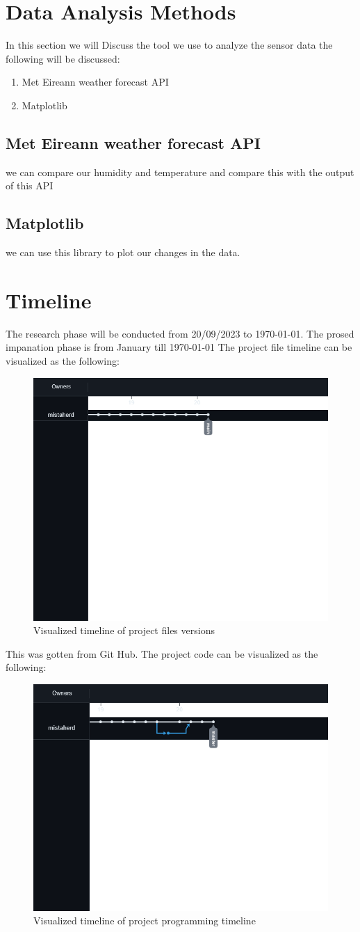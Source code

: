 \section{Data Analysis Methods}
In this section we will Discuss the tool we use to analyze the sensor data the following will be discussed:
\begin{enumerate}
    \item Met Eireann weather forecast API
    \item Matplotlib
\end{enumerate}
\subsection{Met Eireann weather forecast API}
we can compare our humidity and temperature and compare this with the output of this  API
\subsection{Matplotlib}
we can use this library to plot our changes in the data.


\section{Timeline}
The research phase will be conducted from 20/09/2023 to \today. The prosed impanation phase is from January till \today
The project file timeline can be visualized as  the following:
\begin{figure}[h!]
    \centering
    \includegraphics[width=0.5\linewidth]{Images/timeline_of_file.png}
    \caption{Visualized timeline of project files versions}
    \label{Visualized timeline of project files versions}
\end{figure}
This was gotten from Git Hub.
The  project code can be visualized as the following:
\begin{figure}[h!]
    \centering
    \includegraphics[width=0.5\linewidth]{Images/timeline_of_code.png}
    \caption{Visualized timeline of project programming timeline}
    \label{Visualized timeline of project programming timeline}
\end{figure}